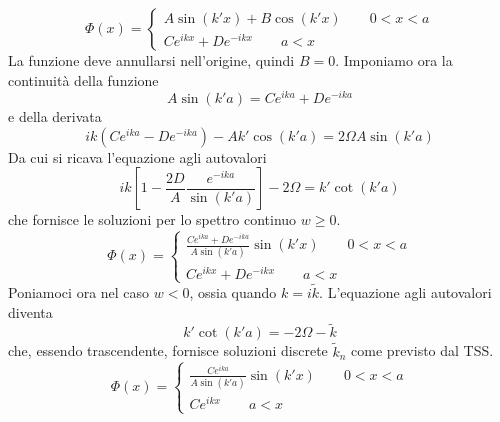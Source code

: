 \documentclass[a4paper]{article}
\begin{document}
        \begin{equation*}
            \Phi(x)=
            \begin{cases}
                A\sin(k'x)+B\cos(k'x) \quad\quad 0<x<a\\
                Ce^{ikx}+De^{-ikx} \quad\quad a<x
            \end{cases}
        \end{equation*}
        La funzione deve annullarsi nell'origine, quindi $B=0$.
        Imponiamo ora la continuità della funzione
        \begin{equation*}
            A\sin(k'a)=Ce^{ika}+De^{-ika}
        \end{equation*}
        e della derivata
        \begin{equation*}
            ik(Ce^{ika}-De^{-ika})-Ak'\cos(k'a)=2\Omega A\sin(k'a)
        \end{equation*}
        Da cui si ricava l'equazione agli autovalori
        \begin{equation*}
            ik\left[1-\frac{2D}{A}\frac{e^{-ika}}{\sin(k'a)}\right]-2\Omega=k'\cot(k'a)
        \end{equation*}
        che fornisce le soluzioni per lo spettro continuo $w\geq 0$.
        \begin{equation*}
            \Phi(x)=
            \begin{cases}
                \frac{Ce^{ika}+De^{-ika}}{A\sin(k'a)}\sin(k'x) \quad\quad 0<x<a\\
                Ce^{ikx}+De^{-ikx} \quad\quad a<x
            \end{cases}
        \end{equation*}
        Poniamoci ora nel caso $w<0$, ossia quando $k=i\tilde{k}$.
        L'equazione agli autovalori diventa
        \begin{equation*}
            k'\cot(k'a)=-2\Omega-\tilde{k}
        \end{equation*}
        che, essendo trascendente, fornisce soluzioni discrete $\tilde{k}_n$ come previsto dal TSS.
        \begin{equation*}
            \Phi(x)=
            \begin{cases}
                \frac{Ce^{ika}}{A\sin(k'a)}\sin(k'x) \quad\quad 0<x<a\\
                Ce^{ikx} \quad\quad a<x
            \end{cases}
        \end{equation*}


    
\end{document}
